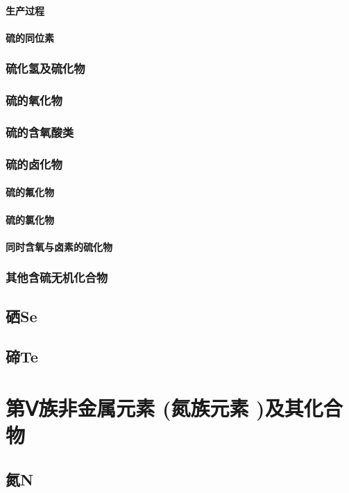 \documentclass[UTF8]{../03-Chemistry}
\begin{document}
            \paragraph{生产过程}
            \paragraph{硫的同位素}
        \subsubsection{硫化氢及硫化物}
        \subsubsection{硫的氧化物}
        \subsubsection{硫的含氧酸类}
        \subsubsection{硫的卤化物}
            \paragraph{硫的氟化物}
            \paragraph{硫的氯化物}
            \paragraph{同时含氧与卤素的硫化物}
        \subsubsection{其他含硫无机化合物}
    \subsection{硒Se}
    \subsection{碲Te}

\section{第Ⅴ族非金属元素 (氮族元素 )及其化合物}
    \subsection{氮N}
\end{document}
